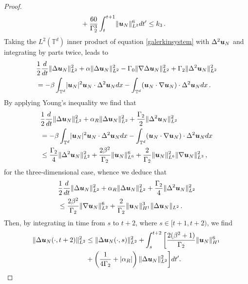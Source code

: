 \documentclass[11pt]{amsart}
\newcommand{\bu}{\mbox{\boldmath$u$}}
\newcommand{\Rb}{\beta}
\newcommand{\Gamzero}{\Gamma_{0}}
\newcommand{\Gamtwo}{\Gamma_{2}}
\theoremstyle{definition}
\numberwithin{equation}{section}
\numberwithin{equation}{section}
\begin{document}
\begin{proof}
\begin{align}
&+ \frac{60}{\Gamtwo^3} \int_t^{t+1} \lVert \bu_N \rVert_{L^2}^6 dt' \leq k_{3}\,. \label{H1absorbingball}
\end{align}
Taking the $L^2 (\mathbb{T}^d)$ inner product of equation \eqref{galerkinsystem} with $\Delta^2 \bu_N$ and integrating by parts twice, leads to
\begin{align*}
&\frac{1}{2} \frac{d}{d t} \lVert \Delta \bu_N \rVert_{L^2}^2 + \alpha \lVert \Delta \bu_N \rVert_{L^2}^2 - \Gamzero \lVert \nabla \Delta \bu_N \rVert_{L^2}^2 + \Gamtwo \lVert \Delta^2 \bu_N \rVert_{L^2}^2 \\
&= - \Rb \int_{\mathbb{T}^d} \lvert \bu_N \rvert^2 \bu_N \cdot \Delta^2 \bu_N dx - \int_{\mathbb{T}^d} (\bu_N \cdot \nabla \bu_N) \cdot \Delta^2 \bu_N dx\,.
\end{align*}
By applying Young's inequality we find that
\begin{align*}
&\frac{1}{2} \frac{d}{d t} \lVert \Delta \bu_N \rVert_{L^2}^2 + \alpha_{R} \lVert \Delta \bu_N \rVert_{L^2}^2 + \frac{\Gamtwo}{2} \lVert \Delta^2 \bu_N \rVert_{L^2}^2 \\
&= - \Rb \int_{\mathbb{T}^d} \lvert \bu_N \rvert^2 \bu_N \cdot \Delta^2 \bu_N dx - \int_{\mathbb{T}^d} (\bu_N \cdot \nabla \bu_N) \cdot \Delta^2 \bu_N dx \\
&\leq \frac{\Gamtwo}{4} \lVert \Delta^2 \bu_N \rVert_{L^2}^2 + \frac{2 \Rb^2}{\Gamtwo} \lVert \bu_N \rVert_{L^6}^6 + \frac{2}{\Gamtwo} \lVert \bu_N \rVert_{L^6}^2 \lVert \nabla \bu_N \rVert_{L^3}^{2}\,,
\end{align*}
for the three-dimensional case, whence we deduce that
\begin{align*}
&\frac{1}{2} \frac{d}{d t} \lVert \Delta \bu_N \rVert_{L^2}^2 + \alpha_{R} \lVert \Delta \bu_N \rVert_{L^2}^2 + \frac{\Gamtwo}{4} \lVert \Delta^2 \bu_N \rVert_{L^2}^2 \\
&\leq \frac{2 \Rb^2}{\Gamtwo} \lVert \nabla \bu_N \rVert_{L^2}^6 + \frac{2}{\Gamtwo} \lVert \bu_N \rVert_{H^1}^{3} \lVert \Delta \bu_N \rVert_{L^2}\,.
\end{align*}
Then, by integrating in time from $s$ to $t+2$, where $s \in [t+1, t+2)$, we find
\begin{align*}
\lVert \Delta \bu_N (\cdot, t+2) \rVert_{L^2}^2 &\leq \lVert \Delta \bu_N (\cdot, s) \rVert_{L^2}^2 + \int_s^{t+2} \bigg[ \frac{2 (\Rb^2 + 1)}{\Gamtwo} \lVert \bu_N \rVert_{H^1}^{6} \\
&+ \left( \frac{1}{4 \Gamtwo} + \lvert \alpha_{R} \rvert \right) \lVert \Delta \bu_N \rVert_{L^2}^2 \bigg] dt'.
\end{align*}

\end{proof}
\end{document}
